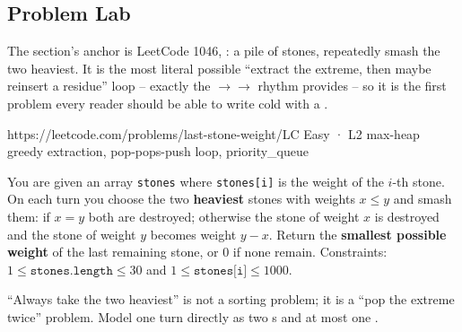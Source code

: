 \subsection{Problem Lab}

The section's anchor is LeetCode 1046, : a pile of stones, repeatedly smash the two
heaviest. It is the most literal possible ``extract the extreme, then maybe reinsert a residue'' loop --
exactly the $\to$$\to$ rhythm  provides -- so it is the
first problem every reader should be able to write cold with a .

  {https://leetcode.com/problems/last-stone-weight/}{LC Easy · L2}
  {max-heap greedy extraction, pop-pops-push loop, priority\_queue}

\begin{problemstatement}
You are given an array \texttt{stones} where \texttt{stones[i]} is the weight of the $i$-th stone. On each
turn you choose the two \textbf{heaviest} stones with weights $x \le y$ and smash them: if $x = y$ both are
destroyed; otherwise the stone of weight $x$ is destroyed and the stone of weight $y$ becomes weight
$y - x$. Return the \textbf{smallest possible weight} of the last remaining stone, or $0$ if none remain.
Constraints: $1 \le \texttt{stones.length} \le 30$ and $1 \le \texttt{stones[i]} \le 1000$.
\end{problemstatement}

\begin{attemptgate}
``Always take the two heaviest'' is not a sorting problem; it is a ``pop the extreme twice'' problem. Model
one turn directly as two s and at most one .
\end{attemptgate}

